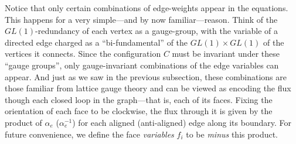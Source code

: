 \documentclass[12pt,hyperref,compress]{JHEP3}
\begin{document}
Notice that only certain combinations of edge-weights appear in the equations. This happens for a very simple---and by now familiar---reason. Think of the $GL(1)$-redundancy of each vertex as a gauge-group, with the variable of a directed edge charged as a ``bi-fundamental'' of the $GL(1)\!\times\!GL(1)$ of the vertices it connects. Since the configuration $C$ must be invariant under these ``gauge groups'',  only gauge-invariant combinations of the edge variables can appear. And just as we saw in the previous subsection, these combinations are those familiar from lattice gauge theory and can be viewed as encoding the flux though each closed loop in the graph---that is, each of its faces. Fixing the orientation of each face to be clockwise, the flux through it is given by the product of $\alpha_e$ ($\alpha_e^{-1}$) for each aligned (anti-aligned) edge along its boundary. For future convenience, we define the face {\it variables} $f_i$ to be {\it minus} this product.
\end{document}
